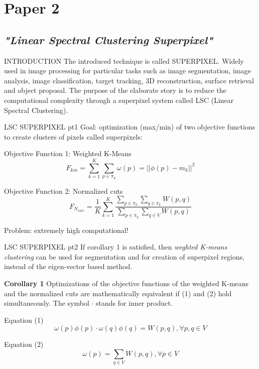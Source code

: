 \documentclass[10pt]{beamer}
\begin{document}
\section{Paper 2}
\subsection{\emph{"Linear Spectral Clustering Superpixel"}}
\begin{frame}{INTRODUCTION}
    The introduced technique is called SUPERPIXEL. Widely used in image 
    processing for particular tasks such as image segmentation, image analysis, 
    image classification, target tracking, 3D reconstruction, surface retrieval and 
    object proposal. The purpose of the elaborate story is to reduce the 
    computational complexity through a superpixel system called LSC (Linear Spectral
    Clustering).
\end{frame}

\begin{frame}{LSC SUPERPIXEL pt1}
    Goal: optimization (max/min) of two objective functions to create clusters of pixels called superpixels:
    \begin{block}{Objective Function 1: Weighted K-Means}
        $$ F_{km} = \sum_{k=1}^K\sum_{p\in\pi_k}\omega(p)= || \phi(p)-m_k ||^2 $$
    \end{block}
    \begin{block}{Objective Function 2: Normalized cuts}
        $$ F_{N_{cuts}} = \frac{1}{K}\sum_{k=1}^K\frac{\sum_{p\in\pi_k}\sum_{q\in\pi_k}W(p,q)}{\sum_{p\in\pi_k}\sum_{q\in{V}}W(p,q)} $$
    \end{block}
    Problem: extremely high computational!
\end{frame}

\begin{frame}{LSC SUPERPIXEL pt2}
    If corollary 1 is satisfied, then  \emph{weghted K-means clustering} can be used 
    for segmentation and for creation of superpixel regions, instead of the 
    eigen-vector based method.
    \begin{block}{\bfseries{Corollary 1}}
        Optimizations of the objective functions of the weighted K-means
        and the normalized cuts are mathematically equivalent if (1) and (2) 
        hold simultaneously. The symbol $ \cdot $ stands for inner product.
    \end{block}

    \begin{block}{Equation (1)}
           $$ \omega(p)\phi(p) \cdot \omega(q)\phi(q) = W(p,q), \forall p,q \in V $$
    \end{block}

    \begin{block}{Equation (2)}
        $$ \omega(p) = \sum_{q \in V} W(p,q), \forall p \in V $$
    \end{block}
\end{frame}
\end{document}
